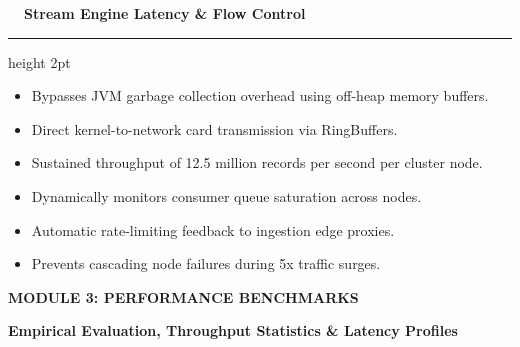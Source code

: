 \documentclass[landscape]{slides}
\newcommand{\slidetitle}[1]{%
  {\Large\bfseries\color{NavyDark} #1}\par\vspace{0.3em}%
  {\color{TealAccent}\hrule height 2pt}\vspace{0.6em}%
}
\newcommand{\sectionbanner}[2]{%
  \begin{center}
    \vspace*{1.2em}
    \begin{tcolorbox}[colback=NavyDark,colframe=TealAccent,arc=4pt,boxrule=1.5pt,center,width=0.9\textwidth]
      \centering
      \vspace{0.4em}
      {\Huge\bfseries\color{white} #1}\par\vspace{0.5em}
      {\large\color{TealAccent}\bfseries #2}
      \vspace{0.4em}
    \end{tcolorbox}
  \end{center}
}
\begin{document}
\begin{slide}
\slidetitle{\faTerminal~~Stream Engine Latency \& Flow Control}

\begin{minipage}[t]{0.48\textwidth}
  \begin{tcolorbox}[colback=CardBg,colframe=TealAccent,title=\textbf{\faMemory~~Zero-Copy Memory Architecture}]
    \small
    \begin{itemize}
      \item Bypasses JVM garbage collection overhead using off-heap memory buffers.
      \item Direct kernel-to-network card transmission via RingBuffers.
      \item Sustained throughput of 12.5 million records per second per cluster node.
    \end{itemize}
  \end{tcolorbox}
\end{minipage}%
\hfill
\begin{minipage}[t]{0.48\textwidth}
  \begin{tcolorbox}[colback=CardBg,colframe=NavyDark,title=\textbf{\faCogs~~Adaptive Backpressure Control}]
    \small
    \begin{itemize}
      \item Dynamically monitors consumer queue saturation across nodes.
      \item Automatic rate-limiting feedback to ingestion edge proxies.
      \item Prevents cascading node failures during 5x traffic surges.
    \end{itemize}
  \end{tcolorbox}
\end{minipage}
\end{slide}

\begin{slide}
\sectionbanner{MODULE 3: PERFORMANCE BENCHMARKS}{Empirical Evaluation, Throughput Statistics \& Latency Profiles}
\end{slide}
\end{document}
